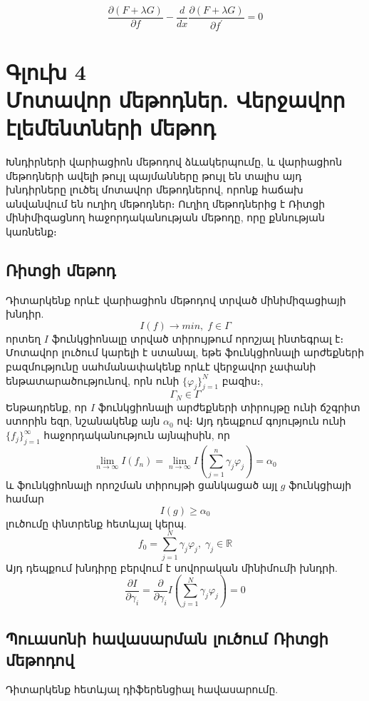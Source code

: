 \documentclass[fleqn, bachelor,subf,12pt,notitlepage]{article}
\begin{document}
$$\dfrac{\partial \left(F+\lambda G\right)}{\partial f} - \dfrac{d}{dx} \dfrac{\partial \left(F+\lambda G\right)}{\partial f^{'}} = 0$$


\newpage


\section*{\centering Գլուխ 4 \\ Մոտավոր մեթոդներ. Վերջավոր էլեմենտների մեթոդ}

Խնդիրների վարիացիոն մեթոդով ձևակերպումը, և վարիացիոն մեթոդների ավելի թույլ պայմանները թույլ են տալիս այդ խնդիրները լուծել մոտավոր մեթոդներով, որոնք հաճախ անվանվում են ուղիղ մեթոդներ։ Ուղիղ մեթոդներից է Ռիտցի մինիմիզացնող հաջորդականության մեթոդը, որը քննության կառնենք։ 

\subsection*{Ռիտցի մեթոդ}
Դիտարկենք որևէ վարիացիոն մեթոդով տրված մինիմիզացիայի խնդիր.
		$$I\left(f\right) \longrightarrow min, \; f \in \Gamma$$
որտեղ $I$ ֆունկցիոնալը տրված տիրույթում որոշյալ ինտեգրալ է։
Մոտավոր լուծում կարելի է ստանալ, եթե ֆունկցիոնալի արժեքների բազմությունը սահմանափակենք որևէ վերջավոր չափանի ենթատարածությունով, որն ունի $\{\varphi_{j}\}_{j=1}^{N}$ բազիս։, 
			  $$\Gamma_{N} \in \Gamma $$
Ենթադրենք, որ $I$ ֆունկցիոնալի արժեքների տիրույթը ունի ճշգրիտ ստորին եզր, նշանակենք այն $\alpha_{0}$ ով։
Այդ դեպքում գոյություն ունի $\{f_{j}\}_{j=1}^{\infty}$ հաջորդականություն այնպիսին, որ
			$$ \lim_{n \to \infty}I\left(f_{n}\right) = \lim_{n \to \infty}I\left( \sum_{j=1}^{n} \gamma_{j}\varphi_{j} \right) = \alpha_{0}$$
և ֆունկցիոնալի որոշման տիրույթի ցանկացած այլ $g$ ֆունկցիայի համար
			$$I\left(g\right) \geq \alpha_{0}$$
լուծումը փնտրենք հետևյալ կերպ.
			$$f_{0}=\sum_{j=1}^{N}\gamma_{j}\varphi_{j}, \; \gamma_{j} \in \mathbb{R}$$
\noindent Այդ դեպքում խնդիրը բերվում է սովորական մինիմումի խնդրի.
   $$\dfrac{\partial I}{\partial \gamma_{i}} = \dfrac{\partial}{\partial \gamma_{i}} I \left(\sum_{j=1}^{N}\gamma_{j}\varphi_{j}\right) = 0 $$
\newpage
\subsection*{Պուասոնի հավասարման լուծում Ռիտցի մեթոդով}

Դիտարկենք հետևյալ դիֆերենցիալ հավասարումը.
\end{document}

